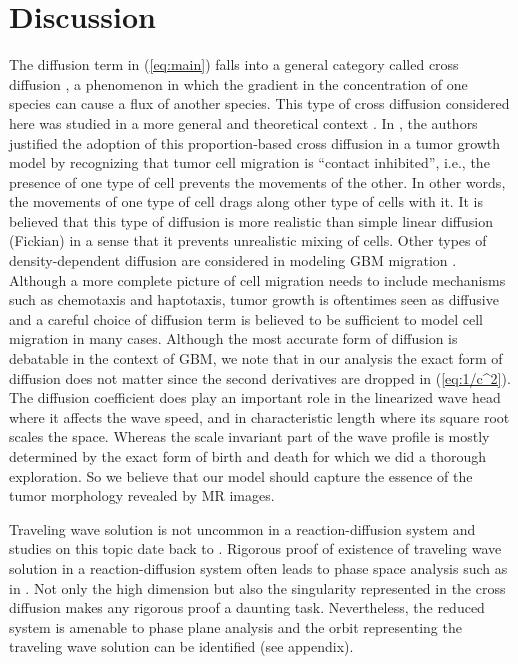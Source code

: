 \documentclass{aims}
\numberwithin{equation}{section}
\begin{document}
\section{Discussion}
The diffusion term in (\ref{eq:main}) falls into a general category
called cross diffusion \cite{Madzvamuse2017}, a phenomenon in which
the gradient in the concentration of one species can cause a flux
of another species. This type of cross diffusion considered here was
studied in a more general and theoretical context \cite{Sherratt2000}.
In \cite{Sherratt2001}, the authors justified the adoption of this
proportion-based cross diffusion in a tumor growth model by recognizing
that tumor cell migration is ``contact inhibited'', i.e., the presence
of one type of cell prevents the movements of the other. In other
words, the movements of one type of cell drags along other type of
cells with it. It is believed that this type of diffusion is more
realistic than simple linear diffusion (Fickian) in a sense that it
prevents unrealistic mixing of cells. Other types of density-dependent
diffusion are considered in modeling GBM migration \cite{Stepien2015a}.
Although a more complete picture of cell migration needs to include
mechanisms such as chemotaxis and haptotaxis, tumor growth is oftentimes
seen as diffusive and a careful choice of diffusion term is believed
to be sufficient to model cell migration in many cases. Although the
most accurate form of diffusion is debatable in the context of GBM,
we note that in our analysis the exact form of diffusion does not
matter since the second derivatives are dropped in (\ref{eq:1/c^2}).
The diffusion coefficient does play an important role in the linearized
wave head where it affects the wave speed, and in characteristic length
where its square root scales the space. Whereas the scale invariant
part of the wave profile is mostly determined by the exact form of
birth and death for which we did a thorough exploration. So we believe
that our model should capture the essence of the tumor morphology
revealed by MR images. 

Traveling wave solution is not uncommon in a reaction-diffusion system
and studies on this topic date back to \cite{FISHER1937}. Rigorous
proof of existence of traveling wave solution in a reaction-diffusion
system often leads to phase space analysis such as in \cite{Dunbar1983}.
Not only the high dimension but also the singularity represented in
the cross diffusion makes any rigorous proof a daunting task. Nevertheless, 
the reduced system is amenable
to phase plane analysis and the orbit representing the traveling wave
solution can be identified (see appendix). 
\end{document}
